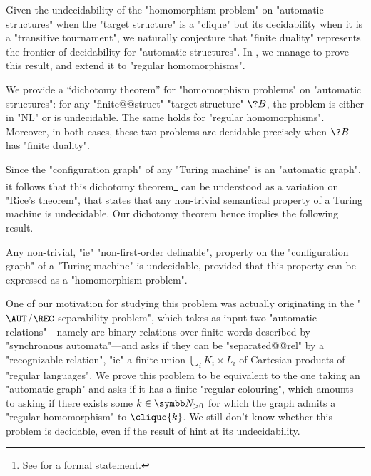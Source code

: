 Given the undecidability of the "homomorphism problem" on "automatic structures" 
when the "target structure" is a "clique" but its decidability when it is a "transitive tournament",
we naturally conjecture that "finite duality" represents the frontier of decidability for "automatic structures". In , we manage to prove this result, and extend it to "regular homomorphisms".

\begin{contribution}
	We provide a ``dichotomy theorem'' for "homomorphism problems" on "automatic structures":
	for any "finite@@struct" "target structure" $\?B$, the problem
	is either in "NL" or is undecidable. The same holds for "regular homomorphisms".
	Moreover, in both cases, these two problems are decidable precisely when $\?B$ has "finite duality".
\end{contribution}

Since the "configuration graph" of any "Turing machine" is an "automatic graph",
it follows that this dichotomy theorem\footnote{See  for a formal statement.} can be understood
as a variation on "Rice's theorem", that states that any non-trivial
semantical property of a Turing machine is undecidable.
Our dichotomy theorem hence implies the following result.

\begin{contribution}
	Any non-trivial, "ie" "non-first-order definable", property on the "configuration graph"
	of a "Turing machine" is undecidable, provided that this property can be expressed
	as a "homomorphism problem".
\end{contribution}

One of our motivation for studying this problem was actually originating
in the "$\AUT$/$\REC$-separability problem", which takes as input two "automatic relations"---namely are binary relations over finite words described by "synchronous automata"---and asks if they can be
"separated@@rel" by a "recognizable relation", "ie" a finite union $\bigcup_i K_i \times L_i$
of Cartesian products of "regular languages". 
We prove this problem to be equivalent to the one taking an "automatic graph" and asks
if it has a finite "regular colouring", which amounts to asking
if there exists some $k\in\Np$ for which the graph admits a "regular homomorphism" to
$\clique{k}$. We still don't know whether this problem is decidable, 
even if the result of  hint at its undecidability.

